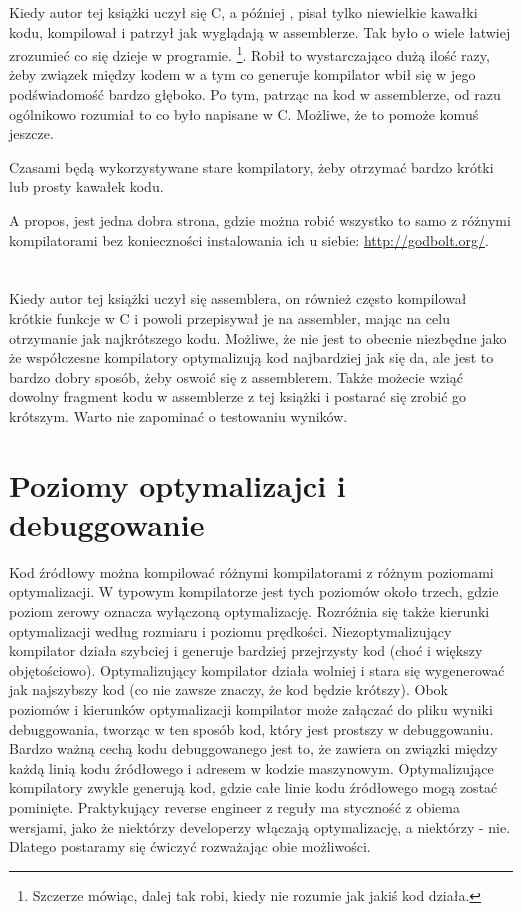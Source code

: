 
Kiedy autor tej książki uczył się C, a później \Cpp, pisał tylko niewielkie kawałki kodu, kompilował i patrzył jak wyglądają w assemblerze. Tak było o wiele łatwiej zrozumieć co się dzieje w programie.%
\footnote{Szczerze mówiąc, dalej tak robi, kiedy nie rozumie jak jakiś kod działa.}.
Robił to wystarczająco dużą ilość razy, żeby związek między kodem w \CCpp a tym co generuje kompilator wbił się w jego podświadomość bardzo głęboko. Po tym, patrząc na kod w assemblerze, od razu ogólnikowo rozumiał to co było napisane w C. Możliwe, że to pomoże komuś jeszcze.


Czasami będą wykorzystywane stare kompilatory, żeby otrzymać bardzo krótki lub prosty kawałek kodu.

A propos, jest jedna dobra strona, gdzie można robić wszystko to samo z różnymi kompilatorami bez konieczności instalowania ich u siebie: \url{http://godbolt.org/}.

\section*{\Exercises}

Kiedy autor tej książki uczył się assemblera, on również często kompilował krótkie funkcje w C i powoli przepisywał je na assembler, mając na celu otrzymanie jak najkrótszego kodu. Możliwe, że nie jest to obecnie niezbędne jako że współczesne kompilatory optymalizują kod najbardziej jak się da, ale jest to bardzo dobry sposób, żeby oswoić się z assemblerem. Także możecie wziąć dowolny fragment kodu w assemblerze z tej książki i postarać się zrobić go krótszym. Warto nie zapominać o testowaniu wyników.

\section*{Poziomy optymalizajci i debuggowanie}

Kod źródłowy można kompilować różnymi kompilatorami z różnym poziomami optymalizacji. W typowym kompilatorze jest tych poziomów około trzech, gdzie poziom zerowy oznacza wyłączoną optymalizację. Rozróżnia się także kierunki optymalizacji według rozmiaru i poziomu prędkości. Niezoptymalizujący kompilator działa szybciej i generuje bardziej przejrzysty kod (choć i większy objętościowo). Optymalizujący kompilator działa wolniej i stara się wygenerować jak najszybszy kod (co nie zawsze znaczy, że kod będzie krótszy). Obok poziomów i kierunków optymalizacji kompilator może załączać do pliku wyniki debuggowania, tworząc w ten sposób kod, który jest prostszy w debuggowaniu. Bardzo ważną cechą kodu debuggowanego jest to, że zawiera on związki między każdą linią kodu źródłowego i adresem w kodzie maszynowym. Optymalizujące kompilatory zwykle generują kod, gdzie całe linie kodu źródłowego mogą zostać pominięte. Praktykujący reverse engineer z reguły ma styczność z obiema wersjami, jako że niektórzy developerzy włączają optymalizację, a niektórzy - nie. Dlatego postaramy się ćwiczyć rozważając obie możliwości.

